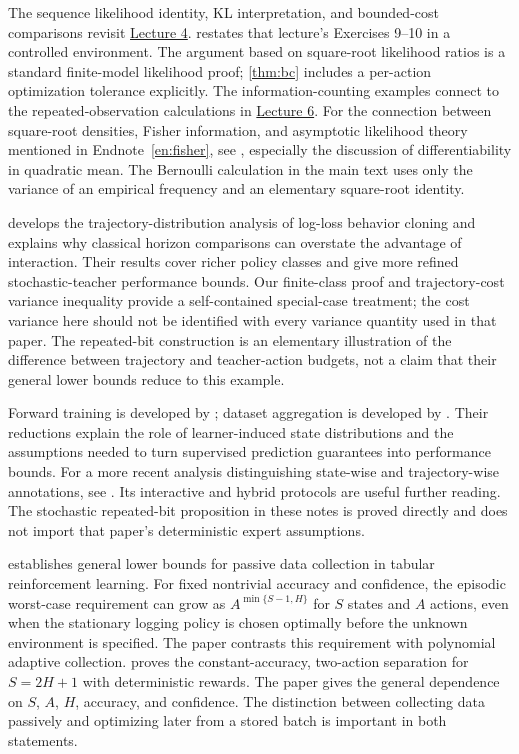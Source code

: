 \documentclass[11pt,twoside]{article}
\theoremstyle{definition}
\theoremstyle{remark}
\begin{document}
The sequence likelihood identity, KL interpretation, and bounded-cost
comparisons revisit \href{lecture04.pdf}{Lecture 4}.
 restates that lecture's Exercises 9--10 in a
controlled environment. The argument based
on square-root likelihood ratios is a standard finite-model likelihood
proof; \cref{thm:bc} includes a per-action optimization tolerance explicitly.
The information-counting examples connect to the repeated-observation
calculations in \href{lecture06.pdf}{Lecture 6}.
For the connection between square-root densities, Fisher information, and
asymptotic likelihood theory mentioned in Endnote~\ref{en:fisher}, see
\citet{bartlett2013}, especially the discussion of differentiability in
quadratic mean. The Bernoulli calculation in the main text uses only the
variance of an empirical frequency and an elementary square-root identity.

\citet{foster2024} develops the trajectory-distribution analysis of
log-loss behavior cloning and explains why classical horizon comparisons
can overstate the advantage of interaction. Their results cover richer
policy classes and give more refined stochastic-teacher performance
bounds. Our finite-class proof and trajectory-cost variance inequality
provide a self-contained special-case treatment; the cost variance here
should not be identified with every variance quantity used in that paper.
The repeated-bit construction is an elementary illustration of the
difference between trajectory and teacher-action budgets, not a claim
that their general lower bounds reduce to this example.

Forward training is developed by \citet{ross2010}; dataset aggregation
is developed by \citet{ross2011}. Their reductions explain the role of
learner-induced state distributions and the assumptions needed to turn
supervised prediction guarantees into performance bounds.
For a more recent analysis distinguishing state-wise and trajectory-wise
annotations, see \citet{li2026}. Its interactive and hybrid protocols are
useful further reading. The stochastic repeated-bit proposition in these
notes is proved directly and does not import that paper's deterministic
expert assumptions.

\citet{xiao2022} establishes general lower bounds for passive data collection
in tabular reinforcement learning. For fixed nontrivial accuracy and
confidence, the episodic worst-case requirement can grow as
$A^{\min\{S-1,H\}}$ for $S$ states and $A$ actions, even when the stationary
logging policy is chosen optimally before the unknown environment is specified.
The paper contrasts this requirement with polynomial adaptive collection.
 proves the constant-accuracy, two-action separation for
$S=2H+1$ with deterministic rewards. The paper gives the general dependence
on $S$, $A$, $H$, accuracy, and confidence.
The distinction between collecting data passively and optimizing
later from a stored batch is important in both statements.
\end{document}
